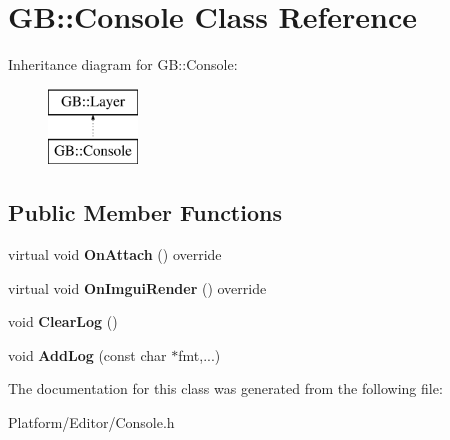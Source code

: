 \hypertarget{class_g_b_1_1_console}{}\section{GB\+::Console Class Reference}
\label{class_g_b_1_1_console}
Inheritance diagram for GB\+::Console\+:\begin{figure}[H]
\begin{center}
\leavevmode
\includegraphics[height=2.000000cm]{class_g_b_1_1_console}
\end{center}
\end{figure}
\subsection*{Public Member Functions}
\begin{DoxyCompactItemize}
\item 
\mbox{\label{class_g_b_1_1_console_aba4bc359af2a60ac310c3f56c687fc9d}} 
virtual void {\bfseries On\+Attach} () override
\item 
\mbox{\label{class_g_b_1_1_console_ac7e0c82de67f0a59002d483eb160b596}} 
virtual void {\bfseries On\+Imgui\+Render} () override
\item 
\mbox{\label{class_g_b_1_1_console_a22faaa3f7261e306e55a7fc4bfc42b82}} 
void {\bfseries Clear\+Log} ()
\item 
\mbox{\label{class_g_b_1_1_console_acc2e2d58f19103201c3362d301294d54}} 
void {\bfseries Add\+Log} (const char $\ast$fmt,...)
\end{DoxyCompactItemize}


The documentation for this class was generated from the following file\+:\begin{DoxyCompactItemize}
\item 
Platform/\+Editor/Console.\+h\end{DoxyCompactItemize}
